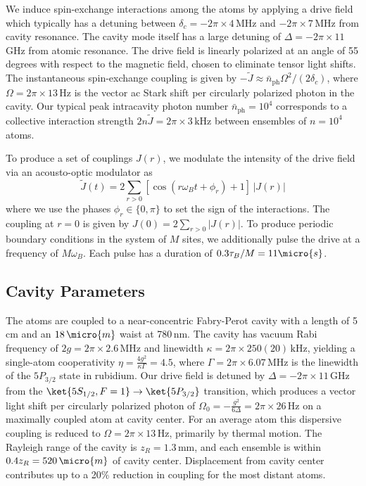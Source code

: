 \documentclass[aps,pra,superscriptaddress,12pt]{revtex4-1} %
\begin{document}
\begin{bibunit}

We induce spin-exchange interactions among the atoms by applying a drive field which typically has a detuning between $\delta_c = -2\pi\times 4\,\text{MHz}$ and $-2\pi\times7\,$MHz from cavity resonance. The cavity mode itself has a large detuning of $\Delta = -2\pi\times 11\,$GHz from atomic resonance. The drive field is linearly polarized at an angle of 55 degrees with respect to the magnetic field, chosen to eliminate tensor light shifts. The instantaneous spin-exchange coupling is given by $-\tilde{J} \approx \bar{n}_\text{ph}\Omega^2/(2\delta_c)$, where $\Omega = 2\pi \times 13\,\text{Hz}$ is the vector ac Stark shift per circularly polarized photon in the cavity.  Our typical peak intracavity photon number $\bar{n}_\text{ph} = 10^4$ corresponds to a collective interaction strength $2n\tilde{J} = 2\pi\times 3\,\text{kHz}$ between ensembles of $n=10^4$ atoms.

To produce a set of couplings $J(r)$, we modulate the intensity of the drive field via an acousto-optic modulator as 
\begin{equation}
\tilde{J}(t)  =  2\sum_{r>0} \left[\cos(r \omega_B t+\phi_r)+1\right]\, |J(r)|
\end{equation}
where we use the phases $\phi_r \in \{0,\pi\}$ to set the sign of the interactions. The coupling at $r = 0$ is given by $J(0) = 2\sum_{r>0} |J(r)|$.
To produce periodic boundary conditions in the system of $M$ sites, we additionally pulse the drive at a frequency of $M\omega_B$. Each pulse has a duration of $0.3 \tau_B/M = 11\micro{s}$.

\subsection{Cavity Parameters}

The atoms are coupled to a near-concentric Fabry-Perot cavity with a length of 5\, cm and an $18\,\micro{m}$ waist at 780\,nm.  The cavity has vacuum Rabi frequency of $2g = 2\pi \times 2.6 \,\text{MHz}$ and linewidth $\kappa = 2\pi\times 250(20)\,\text{kHz}$, yielding a single-atom cooperativity $\eta = \frac{4g^2}{\kappa\Gamma} = 4.5$, where $\Gamma = 2\pi \times 6.07 \,\text{MHz}$ is the linewidth of the $5P_{3/2}$ state in rubidium.  Our drive field is detuned by $\Delta =- 2\pi \times 11 \,\text{GHz}$ from the $\ket{5S_{1/2}, F=1} \rightarrow \ket{5P_{3/2}}$ transition, which produces a vector light shift per circularly polarized photon of $\Omega_0 = -\frac{g^2}{6\Delta} = 2\pi\times26\,\text{Hz}$ on a maximally coupled atom at cavity center. For an average atom this dispersive coupling is reduced to $\Omega = 2\pi\times 13\,\text{Hz}$, primarily by thermal motion. The Rayleigh range of the cavity is $z_R = 1.3\,\text{mm}$, and each ensemble is within $0.4 z_R= 520\,\micro{m}$ of cavity center.  Displacement from cavity center contributes up to a 20\% reduction in coupling for the most distant atoms.


\end{bibunit}
\end{document}
